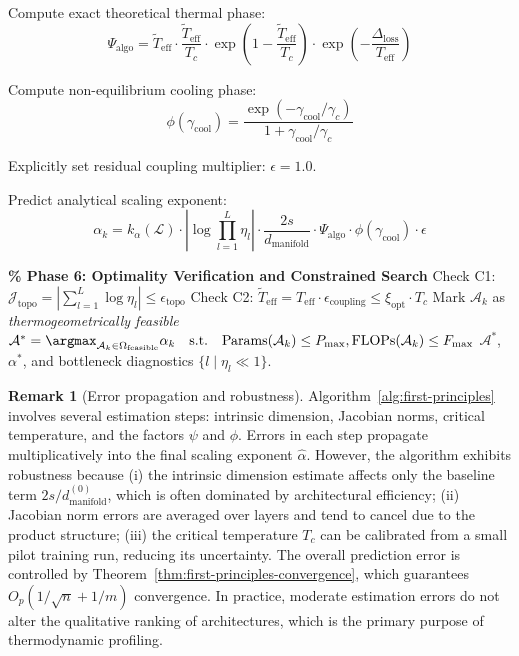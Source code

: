 \documentclass[11pt, a4paper]{article}
\theoremstyle{definition}
\newtheorem{remark}{Remark}[section]
\begin{document}
\begin{algorithm}[htbp]
\begin{algorithmic}[1]
 \STATE Compute exact theoretical thermal phase: 
 \[ \Psi_{\text{algo}} = \tilde{T}_{\text{eff}} \cdot \frac{\tilde{T}_{\text{eff}}}{T_c} \cdot \exp\!\left(1 - \frac{\tilde{T}_{\text{eff}}}{T_c}\right) \cdot \exp\left(-\frac{\Delta_{\text{loss}}}{T_{\text{eff}}}\right) \]
 
 \STATE Compute non-equilibrium cooling phase: 
 \[ \phi(\gamma_{\text{cool}}) = \frac{\exp(-\gamma_{\text{cool}}/\gamma_c)}{1 + \gamma_{\text{cool}}/\gamma_c} \]
 
 \STATE Explicitly set residual coupling multiplier: $\epsilon = 1.0$.
 
 \STATE Predict analytical scaling exponent: 
 \[ \alpha_k = k_\alpha(\mathcal{L}) \cdot \left|\log\prod_{l=1}^L\eta_l\right| \cdot \frac{2s}{d_{\text{manifold}}} \cdot \Psi_{\text{algo}} \cdot \phi(\gamma_{\text{cool}}) \cdot \epsilon \]
\ENDFOR

\STATE \textbf{\% Phase 6: Optimality Verification and Constrained Search}
\STATE Check C1: $\mathcal{J}_{\text{topo}} = \left|\sum_{l=1}^L \log \eta_l\right| \leq \epsilon_{\text{topo}}$
\STATE Check C2: $\tilde{T}_{\text{eff}} = T_{\text{eff}} \cdot \epsilon_{\text{coupling}} \leq \xi_{\text{opt}} \cdot T_c$
 \STATE Mark $\mathcal{A}_k$ as \emph{thermogeometrically feasible}
\ENDIF
\STATE $\mathcal{A}^* = \argmax_{\mathcal{A}_k \in \Omega_{\text{feasible}}} \alpha_k \quad \text{s.t.} \quad \text{Params}(\mathcal{A}_k) \le P_{\max}, \text{FLOPs}(\mathcal{A}_k) \le F_{\max}$
\RETURN $\mathcal{A}^*$, $\alpha^*$, and bottleneck diagnostics $\{l \mid \eta_l \ll 1\}$.
\end{algorithmic}
\end{algorithm}

\begin{remark}[Error propagation and robustness]
Algorithm~\ref{alg:first-principles} involves several estimation steps: intrinsic dimension, Jacobian norms, critical temperature, and the factors $\psi$ and $\phi$. Errors in each step propagate multiplicatively into the final scaling exponent $\hat{\alpha}$. However, the algorithm exhibits robustness because (i) the intrinsic dimension estimate affects only the baseline term $2s/d_{\text{manifold}}^{(0)}$, which is often dominated by architectural efficiency; (ii) Jacobian norm errors are averaged over layers and tend to cancel due to the product structure; (iii) the critical temperature $T_c$ can be calibrated from a small pilot training run, reducing its uncertainty. The overall prediction error is controlled by Theorem~\ref{thm:first-principles-convergence}, which guarantees $O_p(1/\sqrt{n} + 1/m)$ convergence. In practice, moderate estimation errors do not alter the qualitative ranking of architectures, which is the primary purpose of thermodynamic profiling.
\end{remark}
\end{document}
